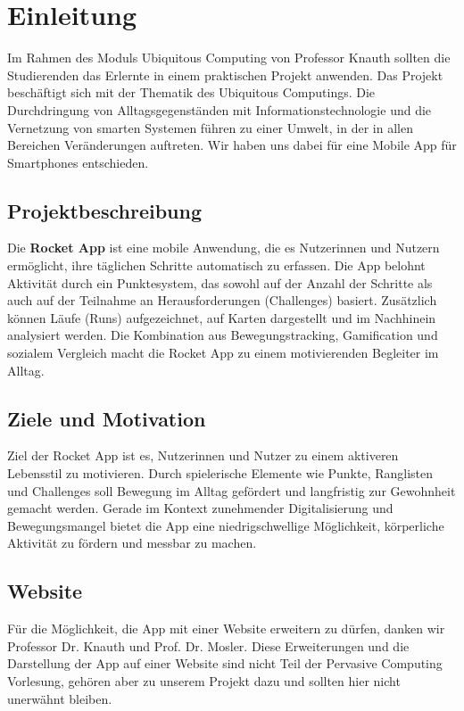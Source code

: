 \documentclass[11pt,a4paper]{article}
\begin{document}
\tableofcontents
\newpage

\section{Einleitung}
Im Rahmen des Moduls Ubiquitous Computing von Professor Knauth sollten die
Studierenden das Erlernte in einem praktischen Projekt anwenden.
Das Projekt beschäftigt sich mit der Thematik des Ubiquitous Computings. Die
Durchdringung von Alltagsgegenständen mit Informationstechnologie und die
Vernetzung von smarten Systemen führen zu einer Umwelt, in der in allen Bereichen
Veränderungen auftreten. Wir haben uns dabei für eine Mobile App für Smartphones entschieden.

\subsection{Projektbeschreibung}
Die \textbf{Rocket App} ist eine mobile Anwendung, die es Nutzerinnen und Nutzern ermöglicht, ihre täglichen Schritte automatisch zu erfassen. Die App belohnt Aktivität durch ein Punktesystem, das sowohl auf der Anzahl der Schritte als auch auf der Teilnahme an Herausforderungen (Challenges) basiert. Zusätzlich können Läufe (Runs) aufgezeichnet, auf Karten dargestellt und im Nachhinein analysiert werden. Die Kombination aus Bewegungstracking, Gamification und sozialem Vergleich macht die Rocket App zu einem motivierenden Begleiter im Alltag.

\subsection{Ziele und Motivation}
Ziel der Rocket App ist es, Nutzerinnen und Nutzer zu einem aktiveren Lebensstil zu motivieren. Durch spielerische Elemente wie Punkte, Ranglisten und Challenges soll Bewegung im Alltag gefördert und langfristig zur Gewohnheit gemacht werden. Gerade im Kontext zunehmender Digitalisierung und Bewegungsmangel bietet die App eine niedrigschwellige Möglichkeit, körperliche Aktivität zu fördern und messbar zu machen.

\subsection{Website}
Für die Möglichkeit, die App mit einer Website erweitern zu dürfen, danken wir Professor Dr. Knauth und Prof. Dr. Mosler.
Diese Erweiterungen und die Darstellung der App auf einer Website sind nicht Teil der Pervasive Computing Vorlesung, gehören aber zu unserem Projekt dazu und sollten hier nicht unerwähnt bleiben.
\end{document}
